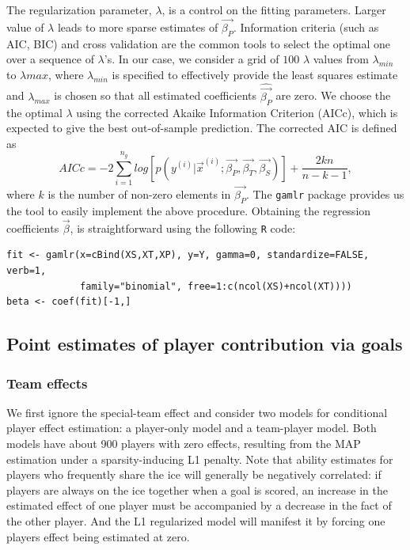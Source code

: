 The regularization parameter, $\lambda$, is a control on the fitting parameters. Larger value of $\lambda$ leads to more sparse estimates of $\vec{\beta_P}$. Information criteria (such as AIC, BIC) and cross validation are the common tools to select the optimal one over a sequence of $\lambda$'s. In our case, we consider a grid of $100$ $\lambda$ values from $\lambda_{min}$ to $\lambda{max}$, where $\lambda_{min}$ is specified to effectively provide the least squares estimate and $\lambda_{max}$ is chosen so that all estimated coefficients $\hat{\vec{\beta_P}}$ are zero. We choose the the optimal $\lambda$ using the corrected Akaike Information Criterion (AICc), which is expected to give the best out-of-sample prediction. The corrected AIC is defined as
\begin{equation*}
AICc = -2\sum_{i=1}^{n_g} log [p(y^{(i)}|\vec{x}^{(i)};\vec{\beta_P},\vec{\beta_T},\vec{\beta_S})] + \frac{2kn}{n-k-1},
\end{equation*}
where $k$ is the number of non-zero elements in $\vec{\beta_P}$. The {\tt gamlr} package \cite{gamlr} provides us the tool to easily implement the above procedure. Obtaining the regression coefficients $\vec{\beta}$, is straightforward using the following {\tt R} code:
\begin{verbatim}
fit <- gamlr(x=cBind(XS,XT,XP), y=Y, gamma=0, standardize=FALSE, verb=1, 
             family="binomial", free=1:c(ncol(XS)+ncol(XT))))
beta <- coef(fit)[-1,]
\end{verbatim}
 
\subsection{Point estimates of player contribution via goals}
\subsubsection{Team effects}
We first ignore the special-team effect and consider two models for conditional player effect estimation: a player-only model and a team-player model. Both models have about 900 players with zero effects, resulting from the MAP estimation under a sparsity-inducing L1 penalty. Note that ability estimates for players who frequently share the ice will generally be negatively correlated: if players are always on the ice together when a goal is scored, an increase in the estimated effect of one player must be accompanied by a decrease in the fact of the other player. And the L1 regularized model will manifest it by forcing one players effect being estimated at zero.

